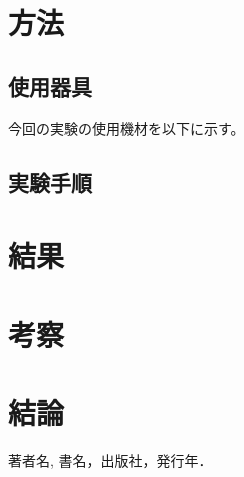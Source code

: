 \documentclass[11pt,dvipdfmx]{jarticle}
\begin{document}
\section{方法}
\subsection{使用器具}
今回の実験の使用機材を以下に示す。

\subsection{実験手順}


\section{結果}
\section{考察}
\section{結論}

\begin{thebibliography}{9}%
	 著者名, 書名，出版社，発行年．
\end{thebibliography}
\end{document}
